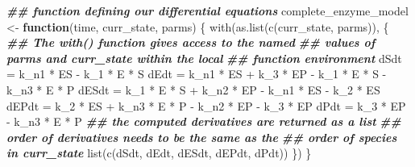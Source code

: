 \documentclass[
]{article}
\newenvironment{Shaded}{\begin{snugshade}}{\end{snugshade}}
\newcommand{\ControlFlowTok}[1]{\textcolor[rgb]{0.13,0.29,0.53}{\textbf{#1}}}
\newcommand{\DocumentationTok}[1]{\textcolor[rgb]{0.56,0.35,0.01}{\textbf{\textit{#1}}}}
\newcommand{\FunctionTok}[1]{\textcolor[rgb]{0.00,0.00,0.00}{#1}}
\newcommand{\NormalTok}[1]{#1}
\newcommand{\OtherTok}[1]{\textcolor[rgb]{0.56,0.35,0.01}{#1}}
\newcommand{\SpecialCharTok}[1]{\textcolor[rgb]{0.00,0.00,0.00}{#1}}
\begin{document}
\begin{Shaded}
\begin{Highlighting}[]
\DocumentationTok{\#\# function defining our differential equations}
\NormalTok{complete\_enzyme\_model }\OtherTok{\textless{}{-}} \ControlFlowTok{function}\NormalTok{(time, curr\_state, }
\NormalTok{    parms) \{}
    \FunctionTok{with}\NormalTok{(}\FunctionTok{as.list}\NormalTok{(}\FunctionTok{c}\NormalTok{(curr\_state, parms)), \{}
        \DocumentationTok{\#\# The with() function gives access to the named}
        \DocumentationTok{\#\# values of parms and curr\_state within the local}
        \DocumentationTok{\#\# function environment}
\NormalTok{        dSdt }\OtherTok{=}\NormalTok{ k\_n1 }\SpecialCharTok{*}\NormalTok{ ES }\SpecialCharTok{{-}}\NormalTok{ k\_1 }\SpecialCharTok{*}\NormalTok{ E }\SpecialCharTok{*}\NormalTok{ S}
\NormalTok{        dEdt }\OtherTok{=}\NormalTok{ k\_n1 }\SpecialCharTok{*}\NormalTok{ ES }\SpecialCharTok{+}\NormalTok{ k\_3 }\SpecialCharTok{*}\NormalTok{ EP }\SpecialCharTok{{-}}\NormalTok{ k\_1 }\SpecialCharTok{*}\NormalTok{ E }\SpecialCharTok{*}\NormalTok{ S }\SpecialCharTok{{-}} 
\NormalTok{            k\_n3 }\SpecialCharTok{*}\NormalTok{ E }\SpecialCharTok{*}\NormalTok{ P}
\NormalTok{        dESdt }\OtherTok{=}\NormalTok{ k\_1 }\SpecialCharTok{*}\NormalTok{ E }\SpecialCharTok{*}\NormalTok{ S }\SpecialCharTok{+}\NormalTok{ k\_n2 }\SpecialCharTok{*}\NormalTok{ EP }\SpecialCharTok{{-}}\NormalTok{ k\_n1 }\SpecialCharTok{*}\NormalTok{ ES }\SpecialCharTok{{-}} 
\NormalTok{            k\_2 }\SpecialCharTok{*}\NormalTok{ ES}
\NormalTok{        dEPdt }\OtherTok{=}\NormalTok{ k\_2 }\SpecialCharTok{*}\NormalTok{ ES }\SpecialCharTok{+}\NormalTok{ k\_n3 }\SpecialCharTok{*}\NormalTok{ E }\SpecialCharTok{*}\NormalTok{ P }\SpecialCharTok{{-}}\NormalTok{ k\_n2 }\SpecialCharTok{*}\NormalTok{ EP }\SpecialCharTok{{-}} 
\NormalTok{            k\_3 }\SpecialCharTok{*}\NormalTok{ EP}
\NormalTok{        dPdt }\OtherTok{=}\NormalTok{ k\_3 }\SpecialCharTok{*}\NormalTok{ EP }\SpecialCharTok{{-}}\NormalTok{ k\_n3 }\SpecialCharTok{*}\NormalTok{ E }\SpecialCharTok{*}\NormalTok{ P}
        \DocumentationTok{\#\# the computed derivatives are returned as a list}
        \DocumentationTok{\#\# order of derivatives needs to be the same as the}
        \DocumentationTok{\#\# order of species in curr\_state}
        \FunctionTok{list}\NormalTok{(}\FunctionTok{c}\NormalTok{(dSdt, dEdt, dESdt, dEPdt, dPdt))}
\NormalTok{    \})}
\NormalTok{\}}
\end{Highlighting}
\end{Shaded}
\end{document}
